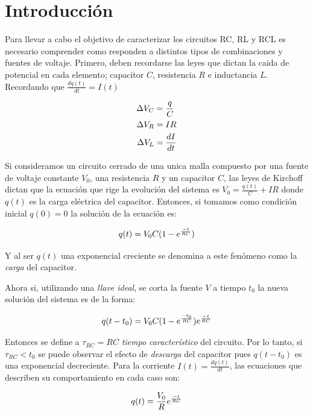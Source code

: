 \documentclass[11pt,a4paper]{article}
\begin{document}
\section{Introducción}\label{sec:intro}
Para llevar a cabo el objetivo de caracterizar los circuitos RC, RL y RCL es necesario comprender como responden a distintos tipos de combinaciones y fuentes de voltaje. Primero, deben recordarse las leyes que dictan la caida de potencial en cada elemento; capacitor $C$, resistencia $R$ e inductancia $L$. Recordando que $\frac{dq(t)}{dt} = I(t)$

\begin{equation}{\label{leyes}}
\begin{split}
\Delta V_C &= \frac{q}{C}\\
\Delta V_R &= IR\\
\Delta V_L &= \frac{dI}{dt}
\end{split}
\end{equation}

Si consideramos un circuito cerrado de una unica malla compuesto por una fuente de voltaje constante $V_{0}$, una resistencia $R$ y un capacitor $C$, las leyes de Kirchoff dictan que la ecuación que rige la evolución del sistema es $V_{0} = \frac{q(t)}{C}+IR$ donde $q(t)$ es la carga eléctrica del capacitor. Entonces, si tomamos como condición inicial $q(0)=0$ la solución de la ecuación es:
   
\begin{equation}{\label{RC_carga}}
q(t)=V_{0}C(1-e^\frac{-t}{RC})
\end{equation}

Y al ser $q(t)$ una exponencial creciente se denomina a este fenómeno como la \textit{carga} del capacitor.

Ahora si, utilizando una \textit{llave ideal}, se corta la fuente $V$ a tiempo $t_{0}$ la nueva solución del sistema es de la forma:

\begin{equation}{\label{RC_descarga}}
q(t-t_{0})=V_{0}C(1-e^\frac{-t_{0}}{RC})e^\frac{-t}{RC}
\end{equation}

Entonces se define a $\tau_{RC}=RC$ \textit{tiempo característico} del circuito. Por lo tanto, si $\tau_{RC}<t_{0}$ se puede observar el efecto de \textit{descarga} del capacitor pues $q(t-t_{0})$ es una exponencial decreciente. Para la corriente $I(t) = \frac{dq(t)}{dt}$, las ecuaciones que describen su comportamiento en cada caso son:

\begin{equation}{\label{RC_carga_I}}
q(t)=\frac{V_{0}}{R}e^\frac{-t}{RC}
\end{equation}
\end{document}
